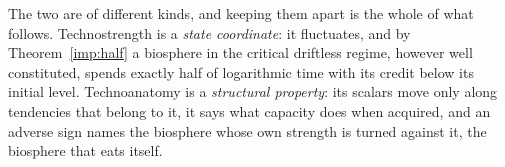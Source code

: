 \begin{definition}
The two are of different kinds, and keeping them apart is the whole of
what follows. Technostrength is a \emph{state coordinate}: it
fluctuates, and by Theorem~\ref{imp:half} a biosphere in the
critical driftless regime, however well constituted, spends exactly half
of logarithmic time with its credit below its initial level. Technoanatomy is a \emph{structural property}: its scalars move only
along tendencies that belong to it, it says what capacity does when
acquired, and an adverse sign names the biosphere whose own strength is
turned against it, the biosphere that eats itself.


\end{definition}
